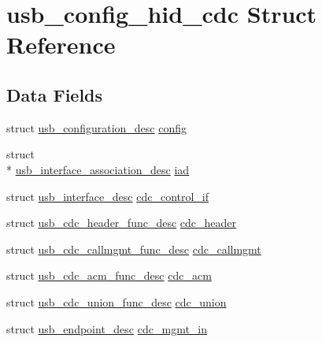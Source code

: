 \hypertarget{structusb__config__hid__cdc}{\section{usb\-\_\-config\-\_\-hid\-\_\-cdc Struct Reference}
\label{structusb__config__hid__cdc}
}
\subsection*{Data Fields}
\begin{DoxyCompactItemize}
\item 
struct \hyperlink{structusb__configuration__desc}{usb\-\_\-configuration\-\_\-desc} \hyperlink{group___p_i_o_s___u_s_b___d_e_s_c_ga41025645591a4ff38c6bfb3bf799cdf1}{config}
\item 
struct \\*
\hyperlink{structusb__interface__association__desc}{usb\-\_\-interface\-\_\-association\-\_\-desc} \hyperlink{group___p_i_o_s___u_s_b___d_e_s_c_ga0dc1bab4cabd04ace89b858ba3f7b259}{iad}
\item 
struct \hyperlink{structusb__interface__desc}{usb\-\_\-interface\-\_\-desc} \hyperlink{group___p_i_o_s___u_s_b___d_e_s_c_ga9cc4f55f507f420505ac9114cf7b9df3}{cdc\-\_\-control\-\_\-if}
\item 
struct \hyperlink{structusb__cdc__header__func__desc}{usb\-\_\-cdc\-\_\-header\-\_\-func\-\_\-desc} \hyperlink{group___p_i_o_s___u_s_b___d_e_s_c_gaedeb1a14bf5f0cfea7d70e97389205c8}{cdc\-\_\-header}
\item 
struct \hyperlink{structusb__cdc__callmgmt__func__desc}{usb\-\_\-cdc\-\_\-callmgmt\-\_\-func\-\_\-desc} \hyperlink{group___p_i_o_s___u_s_b___d_e_s_c_ga1463830a390b3358935b4b39260c5762}{cdc\-\_\-callmgmt}
\item 
struct \hyperlink{structusb__cdc__acm__func__desc}{usb\-\_\-cdc\-\_\-acm\-\_\-func\-\_\-desc} \hyperlink{group___p_i_o_s___u_s_b___d_e_s_c_gafafcc283fdd68e1f1f71b102c226fc23}{cdc\-\_\-acm}
\item 
struct \hyperlink{structusb__cdc__union__func__desc}{usb\-\_\-cdc\-\_\-union\-\_\-func\-\_\-desc} \hyperlink{group___p_i_o_s___u_s_b___d_e_s_c_gafdccd743e5f58edeace549e15f512d44}{cdc\-\_\-union}
\item 
struct \hyperlink{structusb__endpoint__desc}{usb\-\_\-endpoint\-\_\-desc} \hyperlink{group___p_i_o_s___u_s_b___d_e_s_c_gae83909d6ab80cf2e1ce3ecd22d1dc9ec}{cdc\-\_\-mgmt\-\_\-in}
\item 

\end{DoxyCompactItemize}
